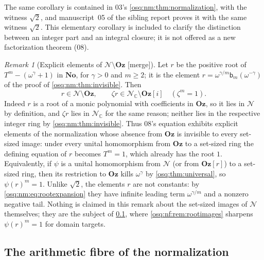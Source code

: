 \documentclass[11pt,letterpaper]{article}
\numberwithin{equation}{section}
\theoremstyle{definition}
\theoremstyle{remark}
\newtheorem{remark}[remark]{Remark}
\theoremstyle{plain}
\newcommand{\No}{\mathbf{No}}
\newcommand{\Oz}{\mathbf{Oz}}
\newcommand{\GOz}{\Oz[i]}
\newcommand{\C}{\mathbb C}
\newcommand{\NN}{\mathcal N}         %
\newcommand{\merge}{\textup{\textsf{[merge]}}}
\begin{document}
The same corollary is contained in 03's \cref{osq:nm:thm:normalization}, with the witness
$\sqrt2$, and manuscript~05 of the sibling report \cite{RepoOdg} proves it with the same
witness $\sqrt2$. This elementary corollary is included to clarify the distinction between
an integer part and an integral closure; it is not offered as a new factorization theorem
(08).

\begin{remark}[Explicit elements of $\NN\setminus\Oz$ \merge]\label{osq:nm:rem:rootinN}
Let $r$ be the positive root of $T^m-(\omega^\gamma+1)$ in $\No$, for $\gamma>0$ and
$m\ge2$; it is the element $r=\omega^{\gamma/m}\mathsf b_m(\omega^{-\gamma})$ of the proof
of \cref{osq:nm:thm:invisible}. Then
\[
 r\in\NN\setminus\Oz,\qquad \zeta r\in\NN_\C\setminus\GOz\quad(\zeta^m=1).
\]
Indeed $r$ is a root of a monic polynomial with coefficients in $\Oz$, so it lies in $\NN$
by definition, and $\zeta r$ lies in $\NN_\C$ for the same reason; neither lies in the
respective integer ring by \cref{osq:nm:thm:invisible}. Thus 08's equation exhibits
explicit elements of the normalization whose absence from $\Oz$ is invisible to every
set-sized image: under every unital homomorphism from $\Oz$ to a set-sized ring the
defining equation of $r$ becomes $T^m=1$, which already has the root $1$. Equivalently, if
$\psi$ is a unital homomorphism from $\NN$ (or from $\Oz[r]$) to a set-sized ring, then its
restriction to $\Oz$ kills $\omega^\gamma$ by \cref{osq:thm:universal}, so $\psi(r)^m=1$.
Unlike $\sqrt2$, the elements $r$ are not constants: by
\eqref{osq:nm:eq:rootexpansion} they have infinite leading term $\omega^{\gamma/m}$ and a
nonzero negative tail. Nothing is claimed in this remark about the set-sized images of $\NN$
themselves; they are the subject of \cref{osq:nf:sub:fibre}, where
\cref{osq:nf:rem:rootimages} sharpens $\psi(r)^m=1$ for domain targets.
\end{remark}

\subsection{The arithmetic fibre of the normalization}\label{osq:nf:sub:fibre}
\end{document}
